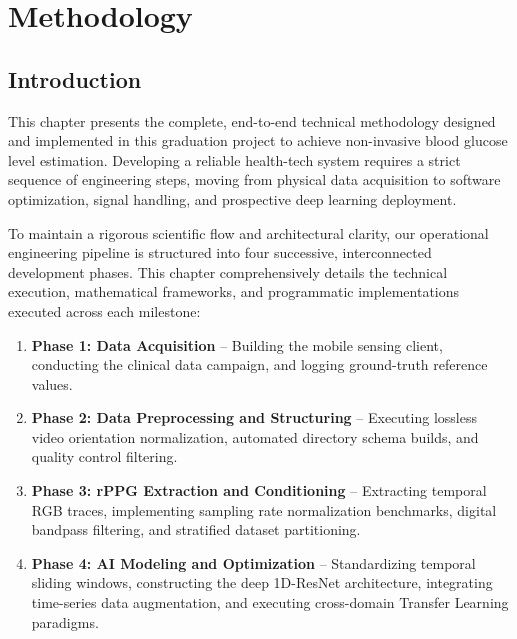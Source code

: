 \clearpage

\chapter{Methodology}
\label{ch:methodology}

\section{Introduction}
\label{sec:methodology_intro}
This chapter presents the complete, end-to-end technical methodology designed and implemented in this graduation project to achieve non-invasive blood glucose level estimation. Developing a reliable health-tech system requires a strict sequence of engineering steps, moving from physical data acquisition to software optimization, signal handling, and prospective deep learning deployment.

To maintain a rigorous scientific flow and architectural clarity, our operational engineering pipeline is structured into four successive, interconnected development phases. This chapter comprehensively details the technical execution, mathematical frameworks, and programmatic implementations executed across each milestone:
\begin{enumerate}
    \item \textbf{Phase 1: Data Acquisition} – Building the mobile sensing client, conducting the clinical data campaign, and logging ground-truth reference values.
    \item \textbf{Phase 2: Data Preprocessing and Structuring} – Executing lossless video orientation normalization, automated directory schema builds, and quality control filtering.
    \item \textbf{Phase 3: rPPG Extraction and Conditioning} – Extracting temporal RGB traces, implementing sampling rate normalization benchmarks, digital bandpass filtering, and stratified dataset partitioning.
    \item \textbf{Phase 4: AI Modeling and Optimization} – Standardizing temporal sliding windows, constructing the deep 1D-ResNet architecture, integrating time-series data augmentation, and executing cross-domain Transfer Learning paradigms.
\end{enumerate}




